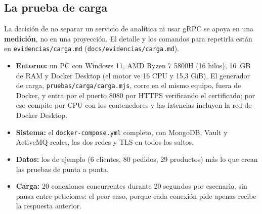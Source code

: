 \subsection{La prueba de carga}

La decisión de no separar un servicio de analítica ni usar gRPC se apoya en una \textbf{medición}, no en una proyección. El detalle y los comandos para repetirla están en \texttt{evidencias/\allowbreak{}carga.\allowbreak{}md} (\texttt{docs/\allowbreak{}evidencias/\allowbreak{}carga.\allowbreak{}md}).


\begin{itemize}[nosep,leftmargin=*]
\item \textbf{Entorno:} un PC con Windows 11, AMD Ryzen 7 5800H (16 hilos), 16~GB de RAM y Docker Desktop (el motor ve 16 CPU y 15,3 GiB). El generador de carga, \texttt{pruebas/\allowbreak{}carga/\allowbreak{}carga.\allowbreak{}mjs}, corre en el mismo equipo, fuera de Docker, y entra por el puerto 8080 por HTTPS verificando el certificado; por eso compite por CPU con los contenedores y las latencias incluyen la red de Docker Desktop.
\item \textbf{Sistema:} el \texttt{docker-\allowbreak{}compose.\allowbreak{}yml} completo, con MongoDB, Vault y ActiveMQ reales, las dos redes y TLS en todos los saltos.
\item \textbf{Datos:} los de ejemplo (6 clientes, 80 pedidos, 29 productos) más lo que crean las pruebas de punta a punta.
\item \textbf{Carga:} 20 conexiones concurrentes durante 20 segundos por escenario, sin pausa entre peticiones: el peor caso, porque cada conexión pide apenas recibe la respuesta anterior.
\end{itemize}

